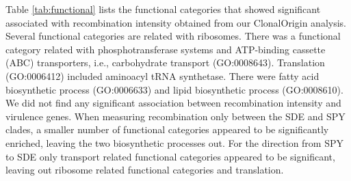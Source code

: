 \documentclass[english]{article}
\begin{document}

Table \ref{tab:functional} lists the functional categories that showed
significant associated with recombination intensity obtained from our 
ClonalOrigin analysis.
Several functional categories are related with ribosomes.
There was a functional category related with phosphotransferase systems
and ATP-binding cassette (ABC) transporters, i.e., carbohydrate transport
(GO:0008643). Translation (GO:0006412) included aminoacyl tRNA synthetase.
There were fatty acid biosynthetic process (GO:0006633) and lipid
biosynthetic process (GO:0008610). We did not find any significant association 
between recombination intensity and virulence genes. When measuring 
recombination only between the SDE and SPY clades, a smaller number of 
functional categories appeared to be significantly enriched, leaving the two 
biosynthetic processes out. For the direction from SPY to SDE only transport 
related
functional categories appeared to be significant, leaving out ribosome related 
functional categories and translation.


\end{document}
